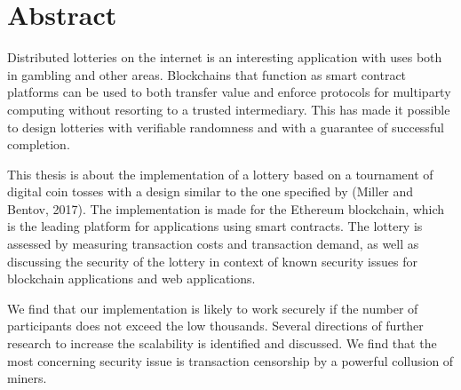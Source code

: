 \chapter*{Abstract}

\begin{center}
Distributed lotteries on the internet is an interesting application with uses both in gambling and other areas. Blockchains that function as smart contract platforms can be used to both transfer value and enforce protocols for multiparty computing without resorting to a trusted intermediary. This has made it possible to design lotteries with verifiable randomness and with a guarantee of successful completion. 

This thesis is about the implementation of a lottery based on a tournament of digital coin tosses with a design similar to the one specified by (Miller and Bentov, 2017). The implementation is made for the Ethereum blockchain, which is the leading platform for applications using smart contracts. The lottery is assessed by measuring transaction costs and transaction demand, as well as discussing the security of the lottery in context of known security issues for blockchain applications and web applications.

We find that our implementation is likely to work securely if the number of participants does not exceed the low thousands. Several directions of further research to increase the scalability is identified and discussed. We find that the most concerning security issue is transaction censorship by a powerful collusion of miners.
\end{center}

\hypersetup{pageanchor=false}